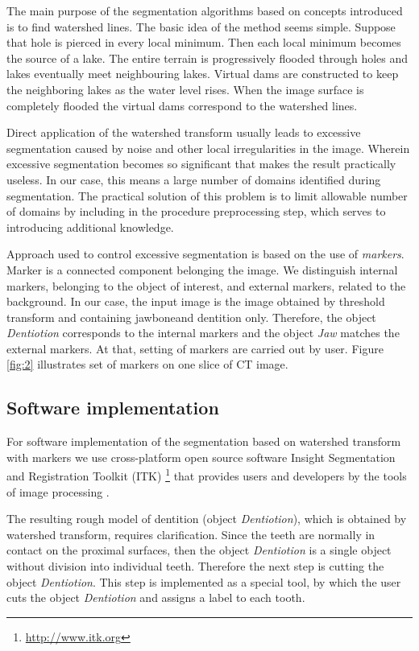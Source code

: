 \documentclass{elsarticle}
\begin{document}
The main purpose of the segmentation algorithms based on concepts
introduced is to find watershed lines. The basic idea of the method
seems simple. Suppose that hole is pierced in every local
minimum. Then each local minimum becomes the source of a lake. The
entire terrain is progressively flooded through holes and lakes
eventually meet neighbouring lakes. Virtual dams are constructed to
keep the neighboring lakes as the water level rises. When the image
surface is completely flooded the virtual dams correspond to the
watershed lines.

Direct application of the watershed transform usually leads to
excessive segmentation caused by noise and other local irregularities
in the image. Wherein excessive segmentation becomes so significant
that makes the result practically useless. In our case, this means a
large number of domains identified during segmentation. The practical
solution of this problem is to limit allowable number of domains by
including in the procedure preprocessing step, which serves to
introducing additional knowledge.

Approach used to control excessive segmentation is based on the use of
\emph{markers}. Marker is a connected component belonging the
image. We distinguish internal markers, belonging to the object of
interest, and external markers, related to the background. In our
case, the input image is the image obtained by threshold transform and
containing jawboneand dentition only. Therefore, the object \emph{Dentiotion}
corresponds to the internal markers and the object \emph{Jaw} matches the
external markers. At that, setting of markers are carried out by
user. Figure \ref{fig:2} illustrates set of markers on one slice of CT
image.

\subsection{Software implementation} 

For software implementation of the segmentation based on watershed
transform with markers we use cross-platform open source software
\textsf{Insight Segmentation and Registration Toolkit} (\textsf{ITK})
\footnote{\url{http://www.itk.org}} that provides users and developers by
the tools of image processing \cite{ITKSoftwareGuideSecondEdition}.

The resulting rough model of dentition (object \emph{Dentiotion}), which
is obtained by watershed transform, requires clarification. Since the
teeth are normally in contact on the proximal surfaces, then the
object \emph{Dentiotion} is a single object without division into
individual teeth. Therefore the next step is cutting the object
\emph{Dentiotion}. This step is implemented as a special tool, by which
the user cuts the object \emph{Dentiotion} and assigns a label to each tooth. 
\end{document}
